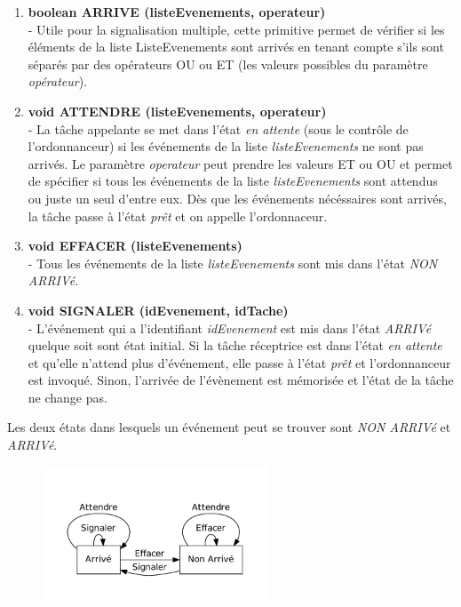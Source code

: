 {
\begin{enumerate}
   \item \textbf{boolean ARRIVE (listeEvenements, operateur)}
	~\\ - Utile pour la signalisation multiple, cette primitive permet de
	vérifier si les éléments de la liste ListeEvenements sont arrivés en tenant
	compte s'ils sont séparés par des opérateurs OU ou ET (les valeurs possibles
	du paramètre \textit{opérateur}).
   \item \textbf{void ATTENDRE (listeEvenements, operateur)}
	~\\ - La tâche appelante se met dans l'état \textit{en attente}
	 (sous le contrôle de l'ordonnanceur) si les événements de la liste
	 \textit{listeEvenements} ne sont pas arrivés. 
	 Le paramètre \textit{operateur} peut prendre les valeurs ET ou OU et 
	 permet de spécifier si tous les événements de la liste
	 \textit{listeEvenements} sont attendus ou juste un seul d'entre eux. 
	 Dès que les événements nécéssaires sont arrivés, la tâche passe à l'état
	 \textit{prêt} et on appelle l'ordonnaceur.
   \item \textbf{void EFFACER (listeEvenements)}
	~\\ - Tous les événements de la liste \textit{listeEvenements} sont
		mis dans l'état \textit{NON ARRIVé}.
	\item \textbf{void SIGNALER (idEvenement, idTache)}
	~\\ - L'événement qui a l'identifiant \textit{idEvenement} est mis dans l'état
	\textit{ARRIVé} quelque soit sont état initial. 
	Si la tâche réceptrice est dans l'état \textit{en attente} et qu'elle n'attend
	plus d'événement, elle passe à l'état \textit{prêt} et l'ordonnanceur est invoqué. 
	Sinon, l'arrivée de l'évènement est mémorisée et l'état de la tâche ne change pas.
\end{enumerate}
}
{
Les deux états dans lesquels un événement peut se trouver sont \textit{NON
ARRIVé} et \textit{ARRIVé}.

\begin{figure} [htp]
\centering
\includegraphics[width=0.6\textwidth]{img/etatEvenement.pdf}
\end{figure}
}
{}
